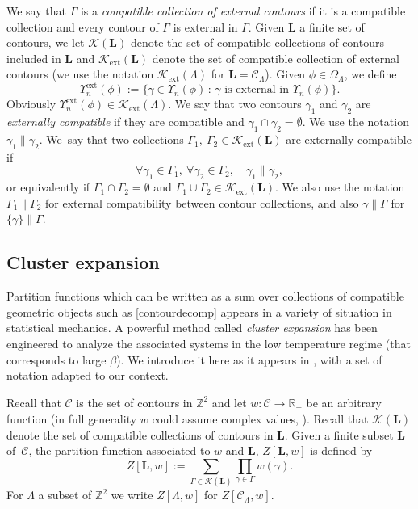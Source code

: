 \documentclass[10pt]{amsart}
\let\mathcal\mathscr
\newcommand{\sep}{\,:\,}
\numberwithin{equation}{section}
\theoremstyle{plain}
\theoremstyle{definition}
\newcommand{\ext}{\mathrm{ext}}
\newcommand{\cC}{{\ensuremath{\mathcal C}} }
\newcommand{\cK}{{\ensuremath{\mathcal K}} }
\newcommand{\bL}{{\ensuremath{\mathbf L}} }
\newcommand{\bbR}{{\ensuremath{\mathbb R}} }
\newcommand{\bbZ}{{\ensuremath{\mathbb Z}} }
\newcommand{\gb}{\beta}
\newcommand{\gG}{\Gamma}
\newcommand{\gO}{\Omega}
\newcommand{\gL}{\Lambda}
\begin{document}
We say that $\gG$ is a \textit{compatible collection of external contours} if it is a compatible collection and every contour of $\gG$ is external in $\gG$.
Given $\bL$ a finite set of contours, we let $\cK(\bL)$ denote the set of compatible collections of contours included in $\bL$ and
$\cK_{\ext}(\bL)$ denote the set of compatible collection of external contours
(we use the notation $\cK_{\ext}(\gL)$ for $\bL=\cC_{\gL}$).
Given $\phi\in \gO_{\gL}$, we define
\begin{equation*}%
\Upsilon^{\ext}_n(\phi):=\{ \gamma \in \Upsilon_n(\phi) \sep \gamma \text{ is external in } \Upsilon_n(\phi) \}.
\end{equation*}
Obviously $ \Upsilon^{\ext}_n(\phi)\in \cK_{\ext}(\gL)$.
We say that two contours $\gamma_1$ and $\gamma_2$ are \textit{externally compatible} if they are compatible and
$\bar \gamma_1\cap \bar \gamma_2=\emptyset$. We use the notation $\gamma_1\parallel \gamma_2$.
We~say that two collections
$\gG_1,\ \gG_2 \in \cK_{\ext}(\bL)$ are externally compatible if
\begin{equation*}%
\forall \gamma_1\in \gG_1, \ \forall \gamma_2\in \gG_2, \quad \gamma_1 \parallel \gamma_2,
\end{equation*}
or equivalently if $\gG_1\cap \gG_2=\emptyset$ and
$\gG_1\cup \gG_2\in \cK_{\ext}(\bL)$.
We also use the notation $\gG_1 \parallel \gG_2$ for external compatibility between contour collections, and also $\gamma \parallel \gG$ for $\{ \gamma \} \parallel \gG$.

\subsection{Cluster expansion}\label{clusexp}

Partition functions which can be written as a sum over collections of compatible geometric objects such as \eqref{contourdecomp}
appears in a variety of situation in statistical mechanics. A powerful method called \textit{cluster expansion} has been engineered to analyze the associated systems in the
low temperature regime (that corresponds to large $\gb$).
We introduce it here as it appears in \cite{cf:KP}, with a set of notation adapted to our context.

Recall that $\cC$ is the set of contours in $\bbZ^2$ and let $w: \cC \to \bbR_+$ be an arbitrary function (in full generality $w$ could assume complex values, \cf \cite{cf:KP}).
Recall that $\cK(\bL)$ denote the set of compatible collections of contours in $\bL$.
Given a finite subset ${\bL}$ of~$\cC$, the partition function associated to $w$ and $\bL$, $Z[\bL,w]$ is defined
by
\begin{equation}\label{weightpar}
Z[\bL,w]:= \sum_{\gG\in \cK(\bL)} \prod_{\gamma \in \gG} w(\gamma).
\end{equation}
For $\gL$ a subset of $\bbZ^2$ we write $Z[\gL,w]$ for $Z[\cC_{\gL},w]$.
\end{document}
